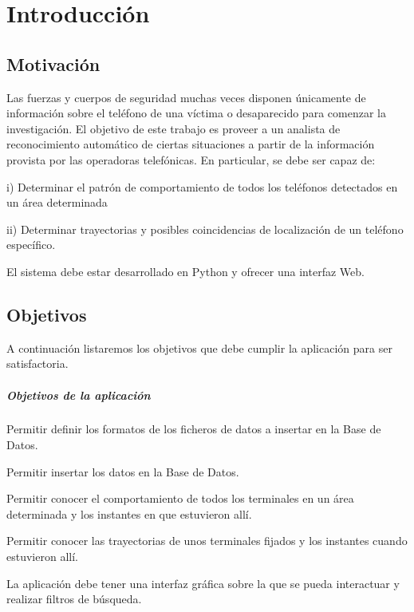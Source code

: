 \chapter{Introducción\label{CAP:INTRODUCCION}}
  \section{Motivación\label{SEC:MOTIVACION}}
    Las fuerzas y cuerpos de seguridad muchas veces disponen únicamente de información sobre el teléfono de una víctima o desaparecido para comenzar la investigación. El objetivo de este trabajo es proveer a un analista de reconocimiento automático de ciertas situaciones a partir de la información provista por las operadoras telefónicas. En particular, se debe ser capaz de:
    
    i) Determinar el patrón de comportamiento de todos los teléfonos detectados en un área determinada
    
    ii) Determinar trayectorias y posibles coincidencias de localización de un teléfono específico. 
    
    El sistema debe estar desarrollado en Python y ofrecer una interfaz Web.
  \section{Objetivos\label{SEC:OBJETIVOS}}
    A continuación listaremos los objetivos que debe cumplir la aplicación para ser satisfactoria.
    \paragraph{Objetivos de la aplicación}
    \begin{objetive}
      \item Permitir definir los formatos de los ficheros de datos a insertar en la Base de Datos.
      \item Permitir insertar los datos en la Base de Datos.
      
      \item Permitir conocer el comportamiento de todos los terminales en un área determinada y los instantes en que estuvieron allí.
      \item Permitir conocer las trayectorias de unos terminales fijados y los instantes cuando estuvieron allí.

      \item La aplicación debe tener una interfaz gráfica sobre la que se pueda interactuar y realizar filtros de búsqueda.
    \end{objetive}
  
